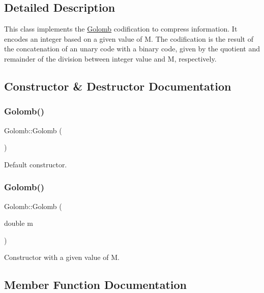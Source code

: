 \subsection{Detailed Description}
This class implements the \hyperlink{classGolomb}{Golomb} codification to compress information. It encodes an integer based on a given value of M. The codification is the result of the concatenation of an unary code with a binary code, given by the quotient and remainder of the division between integer value and M, respectively. 

\subsection{Constructor \& Destructor Documentation}
\mbox{\label{classGolomb_aa6103d56ebec9decc11a69bf6be83208}} 
\subsubsection{\texorpdfstring{Golomb()}{Golomb()}\hspace{0.1cm}{\footnotesize\ttfamily [1/2]}}
{\footnotesize\ttfamily Golomb\+::\+Golomb (\begin{DoxyParamCaption}{ }\end{DoxyParamCaption})\hspace{0.3cm}{\ttfamily [inline]}}

Default constructor. \mbox{\label{classGolomb_aca358c8c3c8706b470c74f64f9509a64}} 
\subsubsection{\texorpdfstring{Golomb()}{Golomb()}\hspace{0.1cm}{\footnotesize\ttfamily [2/2]}}
{\footnotesize\ttfamily Golomb\+::\+Golomb (\begin{DoxyParamCaption}\item[{double}]{m }\end{DoxyParamCaption})\hspace{0.3cm}{\ttfamily [inline]}}

Constructor with a given value of \textquotesingle{}M\textquotesingle{}. 

\subsection{Member Function Documentation}
\mbox{\label{classGolomb_a789cca4aa2ebfb18e2acd50565099ac9}} 
